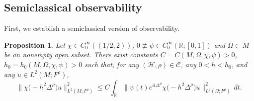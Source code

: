 \documentclass[11pt,oneside,reqno]{amsart}
\newcommand\R{\ensuremath{\mathbb{R}}}
\newtheorem{proposition}[theorem]{Proposition}
\theoremstyle{definition}
\numberwithin{equation}{section}
\theoremstyle{plain}
\begin{document}
\subsection{Semiclassical observability}
First, we establish a semiclassical version of observability.
\begin{proposition}\label{prp-semi-obs}
    Let $\chi \in C_0^\infty ( (1/2,2))$, $0\not \equiv\psi \in C_0^\infty (\R;[0,1])$ and $\Omega \subset M$ be an nonempty open subset. There exist constants $C=C(M,\Omega,\chi,\psi)>0$, $h_0= h_0(M,\Omega,\chi,\psi)>0$ such that, for any $(\mathcal{H},\rho) \in \mathcal{C}$, any $0<h<h_0$,  and any $u\in L^2(M;F^\rho)$,
    \begin{equation}
        \| \chi\bigl(-h^2\Delta^\rho\bigr) u  \|^2_{L^2(M;F^\rho)} \le C\int_\R \| \psi(t) e^{it\Delta^\rho} \chi\bigl( -h^2\Delta^\rho\bigr) u\|^2_{L^2(\Omega; F^\rho)}\,dt.\label{eqn-semi-obs}
    \end{equation}
\end{proposition}
\end{document}
